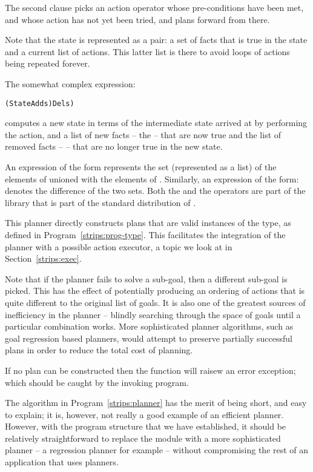 The second  clause picks an action operator whose pre-conditions have been met, and whose action has not yet been tried, and plans forward from there.

Note that the state is represented as a pair: a set of facts that is true in the state and a current list of  actions. This latter list is there to avoid loops of actions being repeated forever.

The somewhat complex expression:
\begin{alltt}
(State\union{}Adds)\difference{}Dels)
\end{alltt}
computes a new state in terms of the intermediate state arrived at by performing the action, and a list of new facts -- the  -- that are now true and the list of removed facts --  -- that are no longer true in the new state.

An expression of the form  represents the set (represented as a list) of the elements of  unioned with the elements of . Similarly, an expression of the form:  denotes the difference of the two sets. Both the \union{} and the  operators are part of the  library that is part of the standard distribution of \go.

This planner directly constructs plans that are valid instances of the  type, as defined in Program~\vref{strips:prog-type}. This facilitates the integration of the planner with a possible action executor, a topic we look at in Section~\vref{strips:exec}.

Note that if the planner fails to solve a sub-goal, then a different sub-goal is picked. This has the effect of potentially producing an ordering of actions that is quite different to the original list of goals. It is also one of the greatest sources of inefficiency in the planner -- blindly searching through the space of goals until a particular combination works. More sophisticated planner algorithms, such as goal regression based planners, would attempt to preserve partially successful plans in order to reduce the total cost of planning.

If no plan can be constructed then the  function will raisew an  error exception; which should be caught by the invoking program.

The algorithm in Program~\vref{strips:planner} has the merit of being short, and easy to explain; it is, however, not really a good example of an efficient planner. However, with the program structure that we have established, it should be relatively straightforward to replace the  module with a more sophisticated planner -- a regression planner for example -- without compromising the rest of an application that uses planners.

